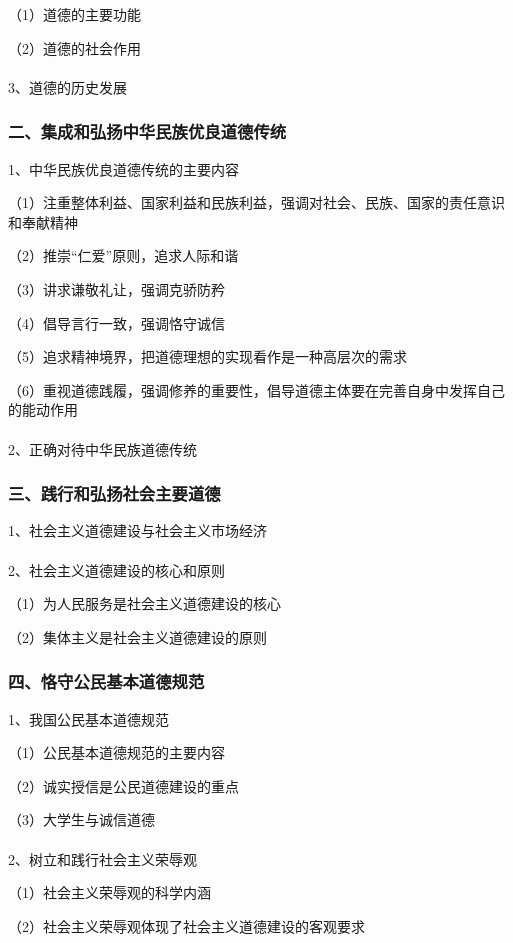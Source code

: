 \documentclass{ctexart}
\begin{document}
（1）道德的主要功能

（2）道德的社会作用
\\\\

3、道德的历史发展

\subsubsection{二、集成和弘扬中华民族优良道德传统}
1、中华民族优良道德传统的主要内容

（1）注重整体利益、国家利益和民族利益，强调对社会、民族、国家的责任意识和奉献精神

（2）推崇“仁爱”原则，追求人际和谐

（3）讲求谦敬礼让，强调克骄防矜

（4）倡导言行一致，强调恪守诚信

（5）追求精神境界，把道德理想的实现看作是一种高层次的需求

（6）重视道德践履，强调修养的重要性，倡导道德主体要在完善自身中发挥自己的能动作用
\\\\

2、正确对待中华民族道德传统

\subsubsection{三、践行和弘扬社会主要道德}
1、社会主义道德建设与社会主义市场经济
\\\\

2、社会主义道德建设的核心和原则

（1）为人民服务是社会主义道德建设的核心

（2）集体主义是社会主义道德建设的原则

\subsubsection{四、恪守公民基本道德规范}
1、我国公民基本道德规范

（1）公民基本道德规范的主要内容

（2）诚实授信是公民道德建设的重点

（3）大学生与诚信道德
\\\\

2、树立和践行社会主义荣辱观

（1）社会主义荣辱观的科学内涵

（2）社会主义荣辱观体现了社会主义道德建设的客观要求
\end{document}
